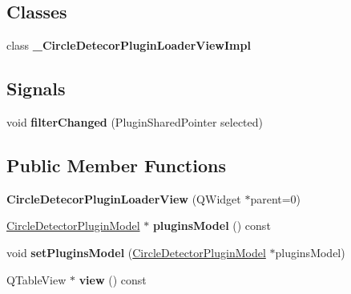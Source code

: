 \subsection*{Classes}
\begin{DoxyCompactItemize}
\item 
class {\bfseries \+\_\+\+Circle\+Detecor\+Plugin\+Loader\+View\+Impl}
\end{DoxyCompactItemize}
\subsection*{Signals}
\begin{DoxyCompactItemize}
\item 
\mbox{\label{class_circle_detecor_plugin_loader_view_a0ea0f41f2396e013223b6fdfdbe3ab81}} 
void {\bfseries filter\+Changed} (Plugin\+Shared\+Pointer selected)
\end{DoxyCompactItemize}
\subsection*{Public Member Functions}
\begin{DoxyCompactItemize}
\item 
\mbox{\label{class_circle_detecor_plugin_loader_view_ae1a55e324518ceddccdf46eae3be8ffd}} 
{\bfseries Circle\+Detecor\+Plugin\+Loader\+View} (Q\+Widget $\ast$parent=0)
\item 
\mbox{\label{class_circle_detecor_plugin_loader_view_a44f84afba2f2d22c4b5b609e31ddf856}} 
\hyperlink{class_circle_detector_plugin_model}{Circle\+Detector\+Plugin\+Model} $\ast$ {\bfseries plugins\+Model} () const
\item 
\mbox{\label{class_circle_detecor_plugin_loader_view_aae31cfc2a3e23c0b59e1f38b5fb256b8}} 
void {\bfseries set\+Plugins\+Model} (\hyperlink{class_circle_detector_plugin_model}{Circle\+Detector\+Plugin\+Model} $\ast$plugins\+Model)
\item 
\mbox{\label{class_circle_detecor_plugin_loader_view_ad5542378dc3e64ea1af65dc119ad403f}} 
Q\+Table\+View $\ast$ {\bfseries view} () const
\end{DoxyCompactItemize}


